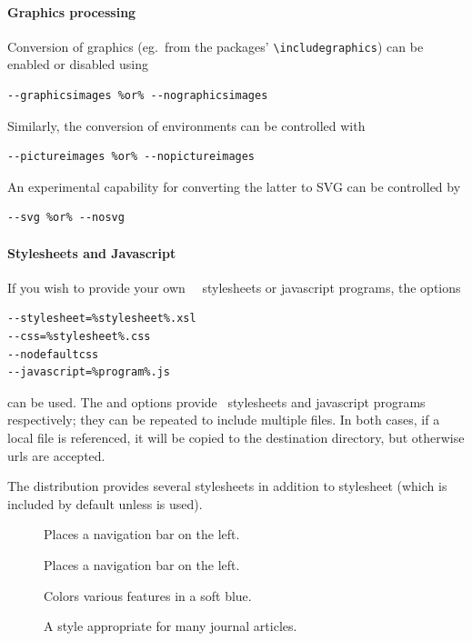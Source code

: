 \documentclass{book}
\begin{document}
\paragraph[Graphics]{Graphics processing}
Conversion of graphics (eg.~from the  packages' 
\verb|\includegraphics|) can be enabled or disabled
using
\begin{lstlisting}[style=shell]
--graphicsimages %or% --nographicsimages
\end{lstlisting}
Similarly, the conversion of  environments can be controlled with
\begin{lstlisting}[style=shell]
--pictureimages %or% --nopictureimages
\end{lstlisting}
An experimental capability for converting the latter to \textsc{SVG} can be
controlled by
\begin{lstlisting}[style=shell]
--svg %or% --nosvg
\end{lstlisting}

\paragraph{Stylesheets and Javascript}
If you wish to provide your own \XSLT\,
\CSS\ stylesheets or javascript programs, the options 
\begin{lstlisting}[style=shell]
--stylesheet=%stylesheet%.xsl
--css=%stylesheet%.css
--nodefaultcss
--javascript=%program%.js
\end{lstlisting}
can be used.  The  and   options provide \CSS\ stylesheets
and javascript programs respectively; they can be repeated to include multiple files.
In both cases, if a local file is referenced, it will be copied to the
destination directory, but otherwise urls are accepted.

The distribution provides several stylesheets in addition to  stylesheet
(which is included by default unless  is used).
\begin{description}
\item[] Places a navigation bar on the left.
\item[] Places a navigation bar on the left.
\item[] Colors various features in a soft blue.
\item[] A style appropriate for many journal articles.
\end{description}
\end{document}
